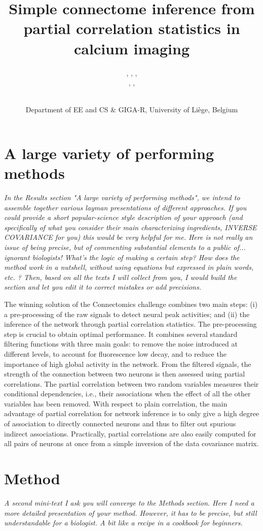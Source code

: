 \documentclass[wcp]{jmlr}
\title{Simple connectome inference from partial correlation statistics in calcium imaging}
\author{\Name{Antonio Sutera},
   \Name{Arnaud Joly},
   \Name{Vincent François-Lavet}, \Email{a.sutera@ulg.ac.be}\\
   \Name{Zixiao Aaron Qiu},
   \Name{Gilles Louppe},
   \Name{Damien Ernst}\and\Name{Pierre Geurts}
    \\
   \addr Department of EE and CS \& GIGA-R, University of Li\`ege, Belgium}
\begin{document}
\section{A large variety of performing methods}

\emph{
In the Results section "A large variety of performing methods", we intend to
assemble together various layman presentations of different approaches. If you
could provide a short popular-science style description of your approach (and
specifically of what you consider their main characterizing ingredients,
INVERSE COVARIANCE for you) this would be very helpful for me.  Here is not
really an issue of being precise, but of commenting substantial elements to a
public of... ignorant biologists! What's the logic of making a certain step?
How does the method work in a nutshell, without using equations but expressed
in plain words, etc. ? Then, based on all the texts I will collect from you, I
would build the section and let you edit it to correct mistakes or add
precisions.\\}

The winning solution of the Connectomics challenge \citep{sutera2014simple}
combines two main steps: (i) a pre-processing of the raw signals to detect
neural peak activities; and (ii) the inference of the network through partial
correlation statistics. The pre-processing step is crucial to obtain optimal
performance. It combines several standard filtering functions with three main
goals: to remove the noise introduced at different levels, to account for
fluorescence low decay, and to reduce the importance of high global activity in
the network. From the filtered signals, the strength of the connection between two
neurons is then assessed using partial correlations. The partial correlation
between two random variables measures their conditional dependencies, i.e.,
their associations when the effect of all the other variables has been
removed. With respect to plain correlation, the main advantage of partial
correlation for network inference is to only give a high degree of association
to directly connected neurons and thus to filter out spurious indirect
associations. Practically, partial correlations are also easily computed for
all pairs of neurons at once from a simple inversion of the data covariance
matrix.


\section{Method}
\emph{A second mini-text I ask you will converge to the Methods section. Here I need
a more detailed presentation of your method. However, it has to be precise, but
still understandable for a biologist. A bit like a recipe in a cookbook for
beginners.\\}
\end{document}
